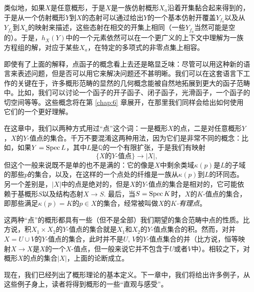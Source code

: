类似地，如果$X$是任意概形，于是$X$是一族仿射概形$X_a$沿着开集黏合起来得到的，于是从一个仿射概形$Y$到$X$的态射可以通过给出$Y$的一个基本仿射开覆盖$Y_{f_a}$以及从$Y_{f_a}$到$X_a$的映射来描述，这些态射在相交的开集上相同（一些$Y_{f_a}$当然可能是空的）。于是，$h_X(Y)$中的一个元素依然可以在一个更广义的上下文中理解为一族方程组的解，对应于某些$X_a$，在特定的多项式的非零点集上相容。

即使有了上面的解释，点函子的概念看上去还是略显乏味：尽管可以用这种新的语言来表述问题，但是否可以用它来解决问题还不甚明晰。我们可以在这套语言下工作的关键在于，许多概形范畴的显然的几何概念能被自然地拓展到更大的函子范畴中。比如，我们可以讨论一个函子的开子函子、闭子函子，光滑函子，一个函子的切空间等等。这些概念将在第 \ref{chap:6} 章展开，在那里我们同样会给出如何使用它们的一个更好理解。

在这章中，我们以两种方式用过“点”这个词：一是概形$X$的点，二是对任意概形$Y$，$X$的$Y$-值点的集合。千万不要混淆这两种用法，因为它们是非常不同的概念：比如，如果$Y=\operatorname{Spec} L$，其中$L$是$\mathbb{Q}$的一个有限扩张，于是我们有映射
\[
	\{\textit{$X$的$Y$-值点}\}\to |X|,
\]
但这个一般来说既不是单的也不是满的：它的像是$X$中剩余类域$\kappa(p)$是$L$的子域的那些$p$的集合，以及，在这样的一个点处的纤维是一族从$\kappa(p)$到$L$的环同态。另一个差别是，$|X|$中的点是绝对的，但是$X$的$Y$-值点的集合是相对的，它可能依赖于基概形$S$以及结构态射$X\to S$. 最后，当$S=\operatorname{Spec} K$时，$X$的$K$-值点的集合，即那些满足$\kappa(p)=K$的$p\in X$的集合，经常被叫做$X$的\textit{$K$-有理点}。

这两种“点”的概形都具有一些（但不是全部）我们期望的集合范畴中点的性质。比方说，积$X_1\times X_2$的$Y$-值点的集合就是$X_1$和$X_2$的$Y$-值点集合的积。然而，对并$X=U\cup V$的$Y$-值点的集合，此时并不是$U$, $V$的$Y$-值点集合的并（比方说，恒等映射$X\to X$是$X$的一个$X$-值点，但一般来说它并不包含于$U$或者$V$中）。相较之下，对概形$X$的点的集合$|X|$，上面的论断成立。

现在，我们已经列出了概形理论的基本定义。下一章中，我们将给出许多例子，从这些例子身上，读者将得到概形的一些“直观与感受”。
